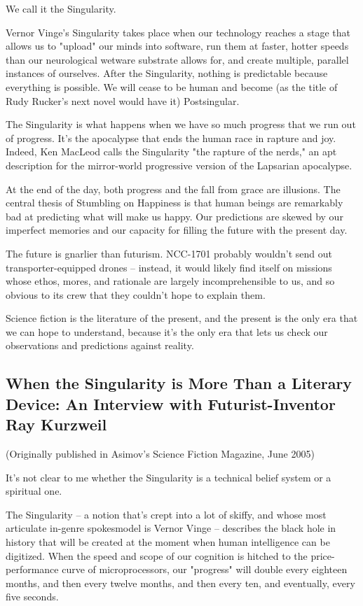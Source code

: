 We call it the Singularity.

Vernor Vinge's Singularity takes place when our technology reaches
a stage that allows us to "upload" our minds into software, run
them at faster, hotter speeds than our neurological wetware
substrate allows for, and create multiple, parallel instances of
ourselves. After the Singularity, nothing is predictable because
everything is possible. We will cease to be human and become (as
the title of Rudy Rucker's next novel would have it) Postsingular.

The Singularity is what happens when we have so much progress that
we run out of progress. It's the apocalypse that ends the human
race in rapture and joy. Indeed, Ken MacLeod calls the Singularity
"the rapture of the nerds," an apt description for the mirror-world
progressive version of the Lapsarian apocalypse.

At the end of the day, both progress and the fall from grace are
illusions. The central thesis of Stumbling on Happiness is that
human beings are remarkably bad at predicting what will make us
happy. Our predictions are skewed by our imperfect memories and our
capacity for filling the future with the present day.

The future is gnarlier than futurism. NCC-1701 probably wouldn't
send out transporter-equipped drones -- instead, it would likely
find itself on missions whose ethos, mores, and rationale are
largely incomprehensible to us, and so obvious to its crew that
they couldn't hope to explain them.

Science fiction is the literature of the present, and the present
is the only era that we can hope to understand, because it's the
only era that lets us check our observations and predictions
against reality.

\subsection{When the Singularity is More Than a Literary Device: An Interview with Futurist-Inventor Ray Kurzweil}

(Originally published in Asimov's Science Fiction Magazine, June
2005)

It's not clear to me whether the Singularity is a technical belief
system or a spiritual one.

The Singularity -- a notion that's crept into a lot of skiffy, and
whose most articulate in-genre spokesmodel is Vernor Vinge --
describes the black hole in history that will be created at the
moment when human intelligence can be digitized. When the speed and
scope of our cognition is hitched to the price-performance curve of
microprocessors, our "progress" will double every eighteen months,
and then every twelve months, and then every ten, and eventually,
every five seconds.

